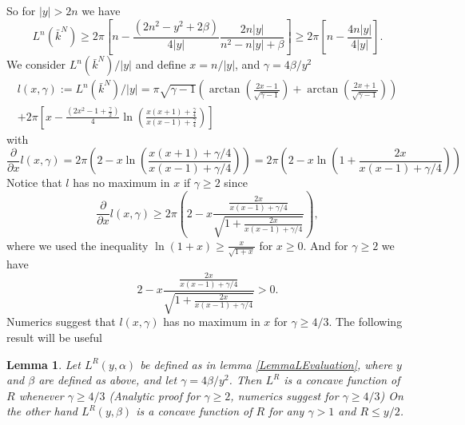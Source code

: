 \documentclass[a4paper,11pt]{article}
\newcommand{\abs}[1]{\left\lvert #1 \right\rvert}
\newtheorem{lemma}{Lemma}
\numberwithin{equation}{section}
\begin{document}
So for $ \abs{y}>2n $ we have \begin{equation}
L^n(\bar{k}^N)\geq2\pi\left[n-\frac{(2n^2-y^2+2\beta)}{4\abs{y}}\frac{2n\abs{y}}{n^2-n\abs{y}+\beta}\right]\geq2\pi\left[n-\frac{4n\abs{y}}{4\abs{y}}\right].
\end{equation}
We consider $ L^n(\bar{k}^N)/\abs{y} $ and define $ x=n/\abs{y} $, and $ \gamma=4\beta/y^2 $\begin{equation}
\begin{aligned}
l(x,\gamma):=L^n(\bar{k}^N)/\abs{y} =\pi\sqrt{\gamma-1}\left(\arctan\left(\frac{2x-1}{\sqrt{\gamma-1}}\right)+\arctan\left(\frac{2x+1}{\sqrt{\gamma-1}}\right)\right)\\+2\pi\left[x-\frac{(2x^2-1+\frac{\gamma}{2})}{4}\ln\left(\frac{x(x+1)+\frac{\gamma}{4}}{x(x-1)+\frac{\gamma}{4}}\right)\right]
\end{aligned}
\end{equation}
with \begin{equation}
\frac{\partial}{\partial x}l(x,\gamma)=2\pi\left(2-x\ln\left(\frac{x(x+1)+\gamma/4}{x(x-1)+\gamma/4}\right)\right)=2\pi\left(2-x\ln\left(1+\frac{2x}{x(x-1)+\gamma/4}\right)\right)
\end{equation}
Notice that $ l $ has no maximum in $ x $ if $ \gamma\geq 2 $ since \begin{equation}
\frac{\partial}{\partial x}l(x,\gamma)\geq 2\pi\left(2-x\frac{\frac{2x}{x(x-1)+\gamma/4}}{\sqrt{1+\frac{2x}{x(x-1)+\gamma/4}}}\right),
\end{equation} 
where we used the inequality $ \ln(1+x)\geq\frac{x}{\sqrt{1+x}} $ for $ x\geq0 $. And for $ \gamma\geq2 $ we have \begin{equation}
2-x\frac{\frac{2x}{x(x-1)+\gamma/4}}{\sqrt{1+\frac{2x}{x(x-1)+\gamma/4}}}>0.
\end{equation} 
Numerics suggest that $ l(x,\gamma) $ has no maximum in $ x $ for  $ \gamma\geq4/3 $. The following result will be useful\begin{lemma}\label{LemmaLConcave}
	Let $ L^R(y,\alpha) $ be defined as in lemma \ref{LemmaLEvaluation}, where $ y $ and $ \beta $ are defined as above, and let $ \gamma=4\beta/y^2 $. Then $ L^R $ is a concave function of $ R $ whenever $ \gamma\geq4/3 $ (Analytic proof for $ \gamma\geq2 $, numerics suggest for $ \gamma\geq4/3 $) On the other hand $ L^R(y,\beta) $ is a concave function of $ R $ for any $ \gamma>1 $ and $ R\leq y/2 $.
\end{lemma}
\end{document}
